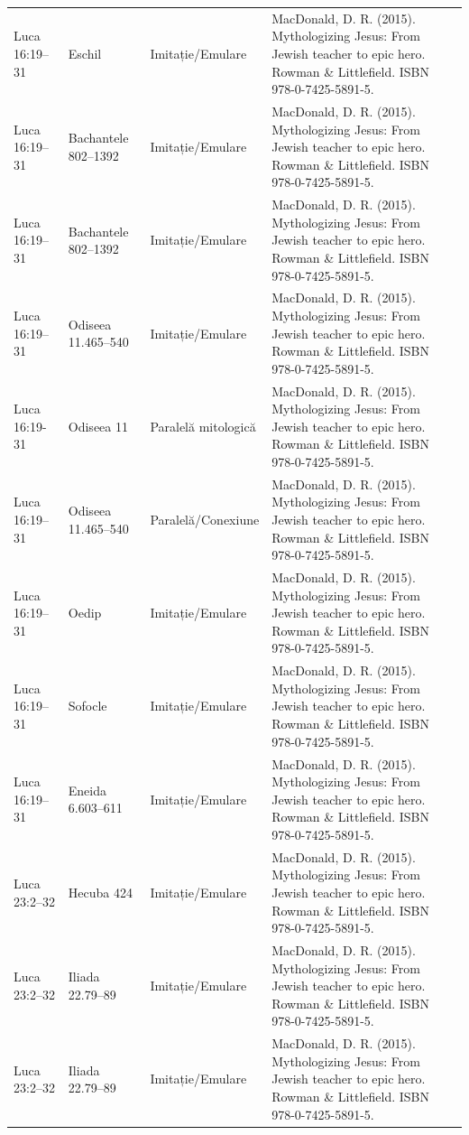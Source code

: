 \documentclass[12pt,a4paper,twoside,openany]{book}
\begin{document}
\begin{longtable}{L{1.4cm}L{1.7cm}L{3.1cm}L{8.4cm}}
Luca 16:19–31 & Eschil & Imitație/Emulare & MacDonald, D. R. (2015). Mythologizing Jesus: From Jewish teacher to epic hero. Rowman \& Littlefield. ISBN 978-0-7425-5891-5. \\
Luca 16:19–31 & Bachantele 802–1392 & Imitație/Emulare & MacDonald, D. R. (2015). Mythologizing Jesus: From Jewish teacher to epic hero. Rowman \& Littlefield. ISBN 978-0-7425-5891-5. \\
Luca 16:19–31 & Bachantele 802–1392 & Imitație/Emulare & MacDonald, D. R. (2015). Mythologizing Jesus: From Jewish teacher to epic hero. Rowman \& Littlefield. ISBN 978-0-7425-5891-5. \\
Luca 16:19–31 & Odiseea 11.465–540 & Imitație/Emulare & MacDonald, D. R. (2015). Mythologizing Jesus: From Jewish teacher to epic hero. Rowman \& Littlefield. ISBN 978-0-7425-5891-5. \\
Luca 16:19-31 & Odiseea 11 & Paralelă mitologică & MacDonald, D. R. (2015). Mythologizing Jesus: From Jewish teacher to epic hero. Rowman \& Littlefield. ISBN 978-0-7425-5891-5. \\
Luca 16:19–31 & Odiseea 11.465–540 & Paralelă/Conexiune & MacDonald, D. R. (2015). Mythologizing Jesus: From Jewish teacher to epic hero. Rowman \& Littlefield. ISBN 978-0-7425-5891-5. \\
Luca 16:19–31 & Oedip & Imitație/Emulare & MacDonald, D. R. (2015). Mythologizing Jesus: From Jewish teacher to epic hero. Rowman \& Littlefield. ISBN 978-0-7425-5891-5. \\
Luca 16:19–31 & Sofocle & Imitație/Emulare & MacDonald, D. R. (2015). Mythologizing Jesus: From Jewish teacher to epic hero. Rowman \& Littlefield. ISBN 978-0-7425-5891-5. \\
Luca 16:19–31 & Eneida 6.603–611 & Imitație/Emulare & MacDonald, D. R. (2015). Mythologizing Jesus: From Jewish teacher to epic hero. Rowman \& Littlefield. ISBN 978-0-7425-5891-5. \\
Luca 23:2–32 & Hecuba 424 & Imitație/Emulare & MacDonald, D. R. (2015). Mythologizing Jesus: From Jewish teacher to epic hero. Rowman \& Littlefield. ISBN 978-0-7425-5891-5. \\
Luca 23:2–32 & Iliada 22.79–89 & Imitație/Emulare & MacDonald, D. R. (2015). Mythologizing Jesus: From Jewish teacher to epic hero. Rowman \& Littlefield. ISBN 978-0-7425-5891-5. \\
Luca 23:2–32 & Iliada 22.79–89 & Imitație/Emulare & MacDonald, D. R. (2015). Mythologizing Jesus: From Jewish teacher to epic hero. Rowman \& Littlefield. ISBN 978-0-7425-5891-5. \\

\end{longtable}
\end{document}
